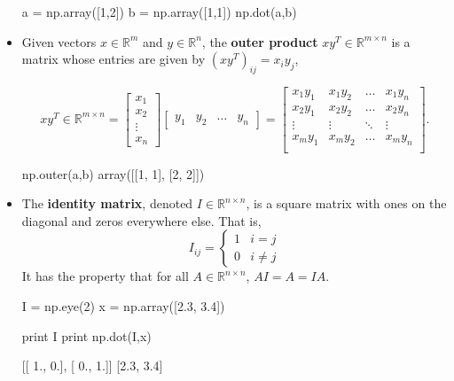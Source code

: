 \begin{itemize}
\begin{python}
a = np.array([1,2])
b = np.array([1,1])
np.dot(a,b)
\end{python}

\item Given vectors $x \in \mathbb{R}^{m}$ and $y \in \mathbb{R}^{n}$, the {\bf outer product} $xy^{T} \in \mathbb{R}^{m\times n}$
is a matrix whose entries are given by $(xy^{T})_{ij}=x_{i}y_{j}$,


\begin{equation*}
xy^{T} \in \mathbb{R}^{m\times n} = \left[\begin{array}{c}
x_{1} \\ x_{2} \\ \vdots \\ x_{n}\end{array}\right] \left[\begin{array}{cccc}
y_{1} &
y_{2} &
\ldots &
y_{n}
\end{array}\right] =   \left[\begin{array}{cccc}
x_{1}y_{1} & x_{1}y_{2} & \ldots & x_{1}y_{n} \\
x_{2}y_{1} & x_{2}y_{2} & \ldots & x_{2}y_{n} \\
\vdots & \vdots & \ddots & \vdots \\
x_{m}y_{1} & x_{m}y_{2} & \ldots & x_{m}y_{n} \\
\end{array}\right].
\end{equation*}

\begin{python}
np.outer(a,b)
array([[1, 1],
       [2, 2]])
\end{python}


\item The {\bf identity matrix}, denoted $I\in \mathbb{R}^{n\times n}$, is a square matrix with ones on the diagonal and zeros 
everywhere else. That is,
\begin{equation*}
I_{ij}=\left\{\begin{array}{cc}
1 & i=j \\
0 & i\neq j
\end{array}\right.
\end{equation*}
It has the property that for all $A \in \mathbb{R}^{n \times n}$, $AI = A = IA.$

\begin{python}
I = np.eye(2)
x = np.array([2.3, 3.4])

print I
print np.dot(I,x)

[[ 1.,  0.],
 [ 0.,  1.]]
[2.3, 3.4]
\end{python}


\end{itemize}
